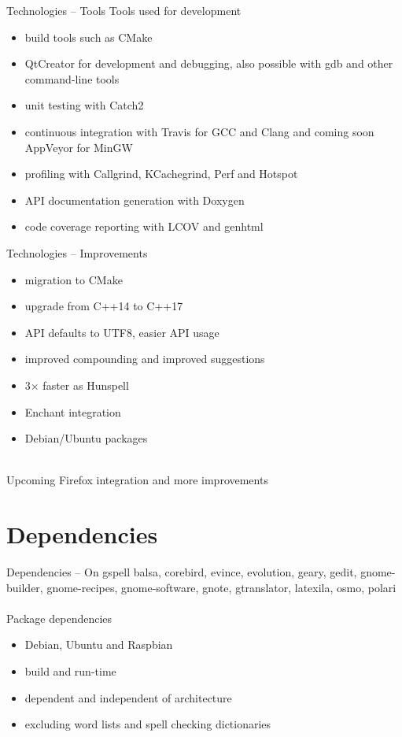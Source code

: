 \documentclass{beamer}
\begin{document}
\begin{frame}{Technologies – Tools}
Tools used for development
\begin{itemize}
\item build tools such as CMake
\item QtCreator for development and debugging, also possible with gdb and other command-line tools
\item unit testing with Catch2
\item continuous integration with Travis for GCC and Clang and coming soon AppVeyor for MinGW
\item profiling with Callgrind, KCachegrind, Perf and Hotspot
\item API documentation generation with Doxygen
\item code coverage reporting with LCOV and genhtml
\end{itemize}
\end{frame}

\begin{frame}{Technologies – Improvements}
\begin{itemize}
\item migration to CMake
\item upgrade from C++14 to C++17
\item API defaults to UTF8, easier API usage
\item improved compounding and improved suggestions
\item 3× faster as Hunspell
\item Enchant integration
\item Debian/Ubuntu packages
\end{itemize}
\mbox{}\\
Upcoming Firefox integration and more improvements
\end{frame}



\section{Dependencies}

\begin{frame}{Dependencies – On gspell}
balsa, corebird, \alert{evince}, \alert{evolution}, geary, \alert{gedit}, gnome-builder, gnome-recipes, gnome-software, gnote, gtranslator, latexila, osmo, polari\\
\mbox{}\\
Package dependencies
\begin{itemize}
\item Debian, Ubuntu and Raspbian
\item build and run-time
\item dependent and independent of architecture
\item excluding word lists and spell checking dictionaries
\end{itemize}
\end{frame}
\end{document}

